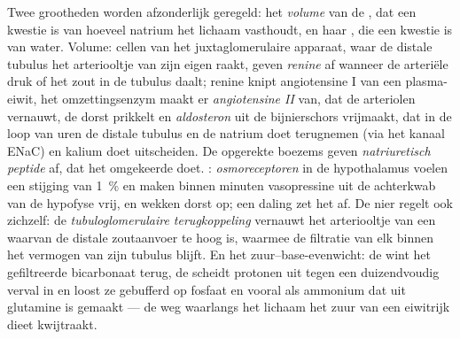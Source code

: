 \begin{definition}[De regelingen]\label{def:b3:renal-osmoregulation:controls}
Twee grootheden worden afzonderlijk geregeld: het \emph{volume} van de
, dat een kwestie is van hoeveel natrium het
lichaam vasthoudt, en haar \emph{}, die een kwestie is van
water. Volume: cellen van het juxtaglomerulaire apparaat, waar de
distale tubulus het arteriooltje van zijn eigen  raakt, geven
\emph{renine} af wanneer de arteriële druk of het zout in de tubulus
daalt; renine knipt angiotensine I van een plasma-eiwit, het
omzettingsenzym maakt er \emph{angiotensine II} van, dat de arteriolen
vernauwt, de dorst prikkelt en \emph{aldosteron} uit de bijnierschors
vrijmaakt, dat in de loop van uren de distale tubulus en de
 natrium doet terugnemen (via het kanaal ENaC) en kalium
doet uitscheiden. De opgerekte boezems geven \emph{natriuretisch
peptide} af, dat het omgekeerde doet. :
\emph{osmoreceptoren} in de hypothalamus voelen een stijging van
\qty{1}{\%} en maken binnen minuten vasopressine uit de achterkwab van
de hypofyse vrij, en wekken dorst op; een daling zet het af. De nier
regelt ook zichzelf: de \emph{tubuloglomerulaire terugkoppeling}
vernauwt het arteriooltje van een  waarvan de distale zoutaanvoer
te hoog is, waarmee de filtratie van elk  binnen het vermogen van
zijn tubulus blijft. En het zuur--base-evenwicht: de 
wint het gefiltreerde bicarbonaat terug, de  scheidt
protonen uit tegen een duizendvoudig verval in en loost ze gebufferd op
fosfaat en vooral als ammonium dat uit glutamine is gemaakt --- de weg
waarlangs het lichaam het zuur van een eiwitrijk dieet kwijtraakt.
\end{definition}

